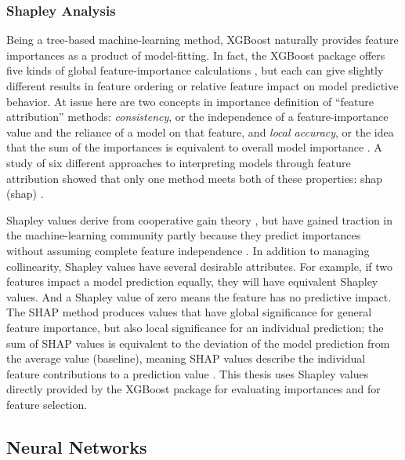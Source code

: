 \subsubsection{Shapley Analysis}\label{ch3:xgb_shapley}

Being a tree-based machine-learning method, XGBoost naturally provides feature importances as a product of model-fitting. In fact, the XGBoost package offers five kinds of global feature-importance calculations \citep{xgboost_developers_xgboost_2020}, but each can give slightly different results in feature ordering or relative feature impact on model predictive behavior. At issue here are two concepts in importance definition of ``feature attribution'' methods: \textit{consistency}, or the independence of a feature-importance value and the reliance of a model on that feature, and \textit{local accuracy}, or the idea that the sum of the importances is equivalent to overall model importance \citep{lundberg_interpretable_2020}. A study of six different approaches to interpreting models through feature attribution showed that only one method meets both of these properties: \acrlong{shap} (\acrshort{shap}) \citep{lundberg_consistent_2019}.

Shapley values derive from cooperative gain theory \citep{shapley_value_1997}, but have gained traction in the machine-learning community partly because they predict importances without assuming complete feature independence \citep{lundberg_unified_2017}. In addition to managing collinearity, Shapley values have several desirable attributes. For example, if two features impact a model prediction equally, they will have equivalent Shapley values. And a Shapley value of zero means the feature has no predictive impact. The SHAP method produces values that have global significance for general feature importance, but also local significance for an individual prediction; the sum of SHAP values is equivalent to the deviation of the model prediction from the average value (baseline), meaning SHAP values describe the individual feature contributions to a prediction value \citep{lundberg_unified_2017}. This thesis uses Shapley values directly provided by the XGBoost package \citep{xgboost_developers_xgboost_2020} for evaluating importances and for feature selection.

\subsection{Neural Networks}\label{ch3:ann}

